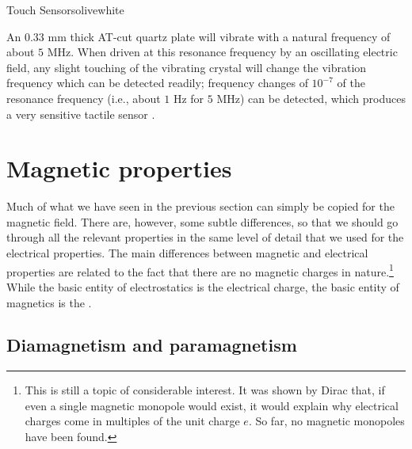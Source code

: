 \begin{messagebox}{Touch Sensors}{olive}{\icinfo}{white}
\begin{minipage}{\textwidth}
An $0.33$ mm thick AT-cut quartz plate will vibrate with a natural frequency of about $5$ MHz. When driven at this resonance frequency by an oscillating electric field, any slight touching of the vibrating crystal will change the vibration frequency which can be detected readily; frequency changes of $10^{-7}$ of the resonance frequency (i.e., about $1$ Hz for $5$ MHz) can be detected, which produces a very sensitive tactile sensor \cite{krishna2004a}.    
\end{minipage}
\end{messagebox}

\section{Magnetic properties}\label{\chabbr:sec:magprop}

Much of what we have seen in the previous section can simply be copied for the magnetic field.  There are, however, some subtle differences, so that we should go through all the relevant properties in the same level of detail that we used for the electrical properties.  The main differences between magnetic and electrical properties are  related to the fact that there are no magnetic charges in nature.\footnote{This is still a topic of considerable interest. It was shown by Dirac that, if even a single magnetic monopole would exist, it would explain why electrical charges  come in multiples of the unit charge $e$.  So far, no magnetic monopoles have been found.}  While the basic entity of electrostatics  is the electrical charge, the basic entity of magnetics is the .

\subsection{Diamagnetism and paramagnetism}

